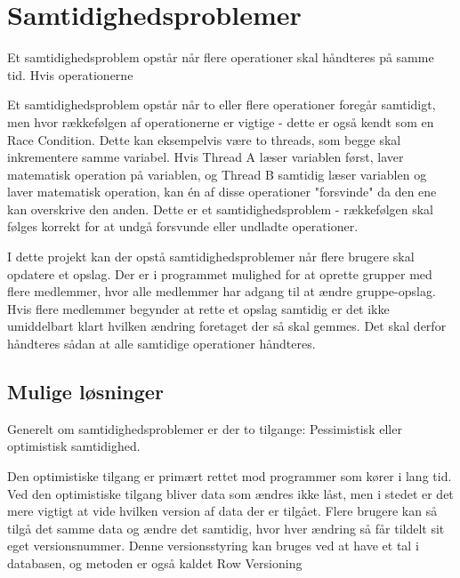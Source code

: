 \chapter{Samtidighedsproblemer}\label{ch:concurrency}
Et samtidighedsproblem opstår når flere operationer skal håndteres på samme tid. Hvis operationerne %

Et samtidighedsproblem opstår når to eller flere operationer foregår samtidigt, men hvor rækkefølgen af operationerne er vigtige - dette er også kendt som en Race Condition.\cite{racecondition} Dette kan eksempelvis være to threads, som begge skal inkrementere samme variabel. Hvis Thread A læser variablen først, laver matematisk operation på variablen, og Thread B samtidig læser variablen og laver matematisk operation, kan én af disse operationer "forsvinde" da den ene kan overskrive den anden. Dette er et samtidighedsproblem - rækkefølgen skal følges korrekt for at undgå forsvunde eller undladte operationer.

I dette projekt kan der opstå samtidighedsproblemer når flere brugere skal opdatere et opslag. Der er i programmet mulighed for at oprette grupper med flere medlemmer, hvor alle medlemmer har adgang til at ændre gruppe-opslag. Hvis flere medlemmer begynder at rette et opslag samtidig er det ikke umiddelbart klart hvilken ændring foretaget der så skal gemmes. Det skal derfor håndteres sådan at alle samtidige operationer håndteres.


\section{Mulige løsninger}\label{sec:solutions}
Generelt om samtidighedsproblemer er der to tilgange: Pessimistisk eller optimistisk samtidighed. 

Den optimistiske tilgang er primært rettet mod programmer som kører i lang tid. Ved den optimistiske tilgang bliver data som ændres ikke låst, men i stedet er det mere vigtigt at vide hvilken version af data der er tilgået. Flere brugere kan så tilgå det samme data og ændre det samtidig, hvor hver ændring så får tildelt sit eget versionsnummer. Denne versionsstyring kan bruges ved at have et tal i databasen, og metoden er også kaldet Row Versioning\cite{rowversioning}

